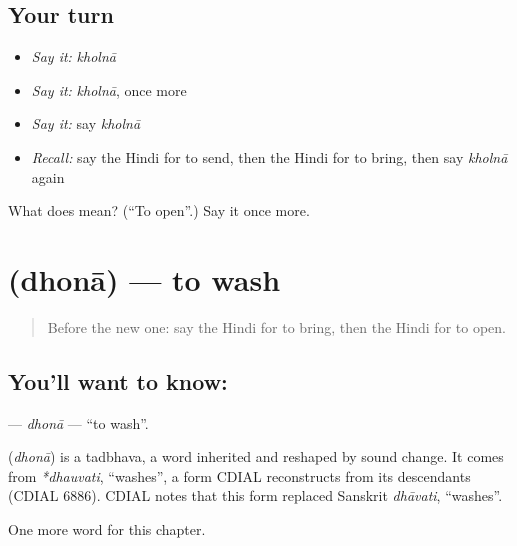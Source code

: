 \subsection*{Your turn}
\begin{itemize}
\raggedright
  \item \emph{Say it:} \emph{kholnā}
  \item \emph{Say it:} \emph{kholnā}, once more
  \item \emph{Say it:} say \emph{kholnā}
  \item \emph{Recall:} say the Hindi for to send, then the Hindi for to bring, then say \emph{kholnā} again
\end{itemize}

\begin{tcolorbox}[breakable,colback=teal!4,colframe=teal!35!black,title={Before you move on}]
What does  mean? (\textquotedblleft{}To open\textquotedblright{}.) Say it once more.
\end{tcolorbox}
\section[\texorpdfstring{\hi{धोना} (dhonā)}{धोना (dhonā)}]{ (dhonā) — to wash}

\label{lesson:HI-C160-dhona}



\begin{quote}
Before the new one: say the Hindi for to bring, then the Hindi for to open.
\end{quote}

\subsection*{You'll want to know: }
\textbf{} — \emph{dhonā} — \textquotedblleft{}to wash\textquotedblright{}.

\begin{cousinweb}
\textbf{} (\emph{dhonā}) is a tadbhava, a word inherited and reshaped by sound change. It comes from \emph{*dhauvati}, \textquotedblleft{}washes\textquotedblright{}, a form CDIAL reconstructs from its descendants (CDIAL 6886). CDIAL notes that this form replaced Sanskrit \emph{dhāvati}, \textquotedblleft{}washes\textquotedblright{}.
\end{cousinweb}

\begin{grammarlens}[title={What you've built}]
One more word for this chapter.
\end{grammarlens}

